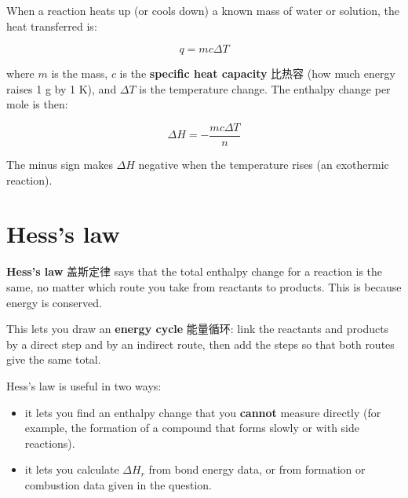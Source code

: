 \documentclass[11pt]{article}
\begin{document}
When a reaction heats up (or cools down) a known mass of water or solution, the heat transferred is:

\[
q = mc\Delta T
\]

where $m$ is the mass, $c$ is the \textbf{specific heat capacity} 比热容 (how much energy raises 1 g by 1 K), and $\Delta T$ is the temperature change. The enthalpy change per mole is then:

\[
\Delta H = -\frac{mc\Delta T}{n}
\]

The minus sign makes $\Delta H$ negative when the temperature rises (an exothermic reaction).

\section*{Hess's law}

\textbf{Hess's law} 盖斯定律 says that the total enthalpy change for a reaction is the same, no matter which route you take from reactants to products. This is because energy is conserved.

This lets you draw an \textbf{energy cycle} 能量循环: link the reactants and products by a direct step and by an indirect route, then add the steps so that both routes give the same total.

Hess's law is useful in two ways:

\begin{itemize}
\item it lets you find an enthalpy change that you \textbf{cannot} measure directly (for example, the formation of a compound that forms slowly or with side reactions).

\item it lets you calculate $\Delta H_r$ from bond energy data, or from formation or combustion data given in the question.

\end{itemize}
\end{document}
